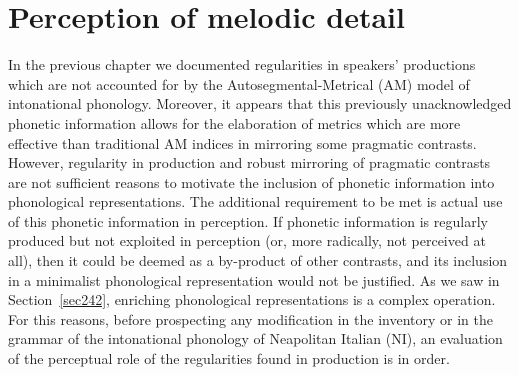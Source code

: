 \chapter[Perception of melodic detail]{Perception of melodic detail}\label{sec3}
In the previous chapter we documented regularities in speakers' productions which are not accounted for by the Autosegmental-Metrical (AM) model of intonational phonology. Moreover, it appears that this previously unacknowledged phonetic information allows for the elaboration of metrics which are more effective than traditional AM indices in mirroring some pragmatic contrasts. However, regularity in production and robust mirroring of pragmatic contrasts are not sufficient reasons to motivate the inclusion of phonetic information into phonological representations. The additional requirement to be met is actual use of this phonetic information in perception. If phonetic information is regularly produced but not exploited in perception (or, more radically, not perceived at all), then it could be deemed as a by-product of other contrasts, and its inclusion in a minimalist phonological representation would not be justified. As we saw in  Section~\ref{sec242}, enriching phonological representations is a complex operation. For this reasons, before prospecting any modification in the inventory or in the grammar of the intonational phonology of Neapolitan Italian (NI), an evaluation of the perceptual role of the regularities found in production is in order.

